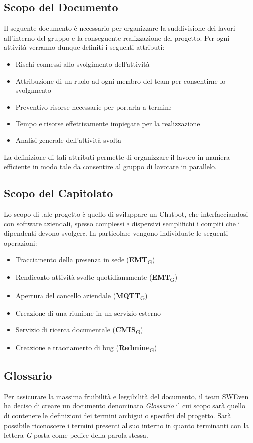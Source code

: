 \subsection{Scopo del Documento}
Il seguente documento è necessario per organizzare la suddivisione dei lavori all'interno del gruppo e la conseguente realizzazione del progetto. Per ogni attività verranno dunque definiti i seguenti attributi: 
\begin{itemize}
    \item Rischi connessi allo svolgimento dell'attività
    \item Attribuzione di un ruolo ad ogni membro del team per consentirne lo svolgimento
    \item Preventivo risorse necessarie per portarla a termine
    \item Tempo e risorse effettivamente impiegate per la realizzazione
    \item Analisi generale dell'attività svolta
\end{itemize}
La definizione di tali attributi permette di organizzare il lavoro in maniera efficiente in modo tale da consentire al gruppo di lavorare in parallelo. 

\subsection{Scopo del Capitolato}
Lo scopo di tale progetto è quello di sviluppare un Chatbot, che interfacciandosi con software aziendali, spesso complessi e dispersivi semplifichi i compiti che i dipendenti devono svolgere. In particolare vengono individuate le seguenti operazioni: 
\begin{itemize}
    \item Tracciamento della presenza in sede (\textbf{EMT}\textsubscript{G})
    \item Rendiconto attività svolte quotidianamente (\textbf{EMT}\textsubscript{G})
    \item Apertura del cancello aziendale (\textbf{MQTT}\textsubscript{G})
    \item Creazione di una riunione in un servizio esterno
    \item Servizio di ricerca documentale (\textbf{CMIS}\textsubscript{G})
    \item Creazione e tracciamento di bug (\textbf{Redmine}\textsubscript{G})
\end{itemize}

\subsection{Glossario}
Per assicurare la massima fruibilità e leggibilità del documento, il team SWEven ha deciso di creare un documento denominato \textit{Glossario} il cui scopo sarà quello di contenere le definizioni dei termini ambigui o specifici del progetto. Sarà possibile riconoscere i termini presenti al suo interno in quanto terminanti con la lettera \textit{G} posta come pedice della parola stessa. 
